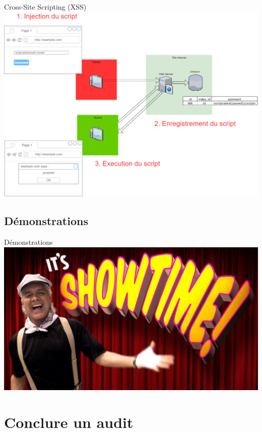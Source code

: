 \documentclass{beamer}
\begin{document}
\begin{frame}{Cross-Site Scripting (XSS)}
\centering
\includegraphics[width=0.92\paperwidth ]{schemas/images/XSS.png}
\end{frame}
\subsection{Démonstrations}
\begin{frame}{Démonstrations}
\centering
\includegraphics[width=0.92\paperwidth ]{schemas/images/showtime.jpg}
\end{frame}

\section{Conclure un audit}	
\end{document}
